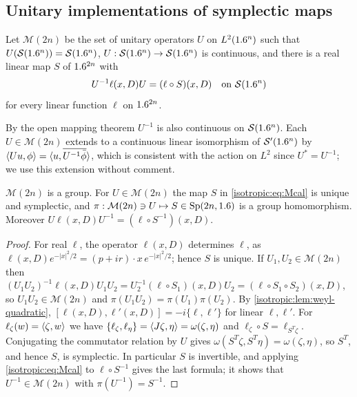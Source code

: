\subsection{Unitary implementations of symplectic maps}

\begin{definition}\label{isotropic:def:Mcal}
Let $\mathcal M(2n)$ be the set of unitary operators $U$ on $L^2(1.6^n)$ such
that $U(\mathcal{S}(1.6^n))=\mathcal{S}(1.6^n)$, $U:\mathcal{S}(1.6^n)\to\mathcal{S}(1.6^n)$ is continuous, and
there is a real linear map $S$ of $1.6^{2n}$ with
\begin{equation}\label{isotropic:eq:Mcal}
  U^{-1}\ell(x,D)U=(\ell\circ S)(x,D)\quad\text{on }\mathcal{S}(1.6^n)
\end{equation}
for every linear function $\ell$ on $1.6^{2n}$.
\end{definition}

By the open mapping theorem $U^{-1}$ is also continuous on $\mathcal{S}(1.6^n)$.
Each $U\in\mathcal M(2n)$ extends to a continuous linear isomorphism of
$\mathcal{S}'(1.6^n)$ by $\langle Uu, \phi\rangle=\langle u, \overline{U^{-1}\bar\phi}\rangle$, which is
consistent with the action on $L^2$ since $U^*=U^{-1}$; we use this extension
without comment.

\begin{lemma}\label{isotropic:lem:Mcal-group}
$\mathcal M(2n)$ is a group. For $U\in\mathcal M(2n)$ the map $S$ in
\eqref{isotropic:eq:Mcal} is unique and symplectic, and
$\pi:\mathcal M(2n)\ni U\mapsto S\in\mathrm{Sp}(2n,1.6)$ is a group
homomorphism. Moreover $U\ell(x,D)U^{-1}=(\ell\circ S^{-1})(x,D)$.
\end{lemma}
\begin{proof}
For real $\ell$, the operator $\ell(x,D)$ determines $\ell$, as
$\ell(x,D)e^{-|x|^2/2}=(p+ir)\cdot x\,e^{-|x|^2/2}$; hence $S$ is unique. If
$U_1,U_2\in\mathcal M(2n)$ then
$(U_1U_2)^{-1}\ell(x,D)U_1U_2=U_2^{-1}(\ell\circ S_1)(x,D)U_2=(\ell\circ S_1\circ S_2)(x,D)$,
so $U_1U_2\in\mathcal M(2n)$ and $\pi(U_1U_2)=\pi(U_1)\pi(U_2)$. By
\cref{isotropic:lem:weyl-quadratic}, $[\ell(x,D),\ell'(x,D)]=-i\{\ell,\ell'\}$ for linear
$\ell,\ell'$. For $\ell_\zeta(w)=\langle \zeta, w\rangle$ we have
$\{\ell_\zeta,\ell_\eta\}=\langle J\zeta, \eta\rangle=\omega(\zeta,\eta)$ and
$\ell_\zeta\circ S=\ell_{S^T\zeta}$. Conjugating the commutator relation by $U$
gives $\omega(S^T\zeta,S^T\eta)=\omega(\zeta,\eta)$, so $S^T$, and hence $S$, is
symplectic. In particular $S$ is invertible, and applying
\eqref{isotropic:eq:Mcal} to $\ell\circ S^{-1}$ gives the last formula; it
shows that $U^{-1}\in\mathcal M(2n)$ with $\pi(U^{-1})=S^{-1}$.
\end{proof}

